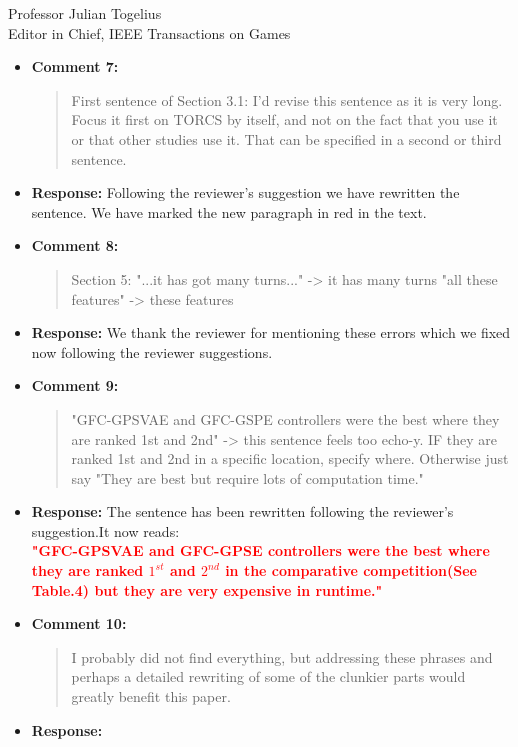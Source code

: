 \documentclass[10pt]{letter} %
\begin{document}
\begin{letter}{Professor Julian Togelius \\ Editor in Chief, IEEE Transactions on Games}
\begin{enumerate}
\begin{itemize}
		\item {\bf Comment 7:}
			\begin{quote}
				First sentence of Section 3.1: I'd revise this sentence as it is very long. Focus it first on TORCS by itself, and not on the fact that you use it or that other studies use it. That can be specified in a second or third sentence.
			\end{quote}	
		\item {\bf Response:} 
				Following the reviewer's suggestion we have rewritten the sentence. We have marked the new paragraph in red in the text.
		\item {\bf Comment 8:}
			\begin{quote}
				Section 5:
				"...it has got many turns..." -> it has many turns
				"all these features" -> these features
			\end{quote}	
		\item {\bf Response:} 
			We thank the reviewer for mentioning these errors which we fixed now following the reviewer suggestions.
		\item {\bf Comment 9:}
			\begin{quote}
				"GFC-GPSVAE and GFC-GSPE controllers were the best where they are ranked 1st and 2nd" -> this sentence feels too echo-y. IF they are ranked 1st and 2nd in a specific location, specify where. Otherwise just say "They are best but require lots of computation time."
			\end{quote}	
		\item {\bf Response:} 
			The sentence has been rewritten following the reviewer's suggestion.It now reads:\\
		\textcolor{red}{	{\bf "GFC-GPSVAE and GFC-GPSE controllers were the best where 	they are ranked $1^{st}$ and $2^{nd}$ in the comparative competition(See Table.4) but they are very expensive in runtime."}}	
		\item {\bf Comment 10:}
			\begin{quote}
				I probably did not find everything, but addressing these phrases and perhaps a detailed rewriting of some of the clunkier parts would greatly benefit this paper.
			\end{quote}	
		\item {\bf Response:} 
    \end{itemize}

\newpage


\end{enumerate}
\end{letter}
\end{document}
